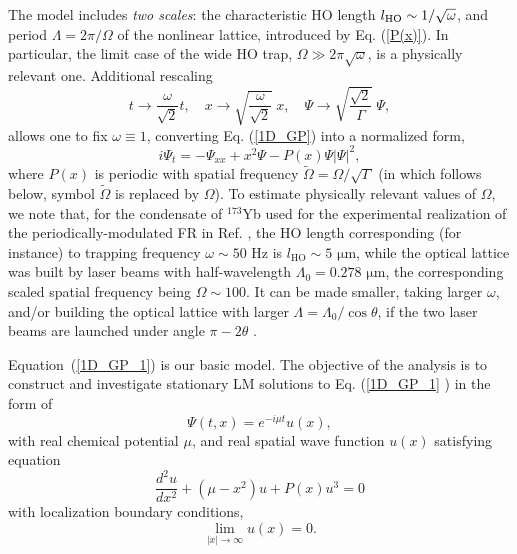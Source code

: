 \documentclass[aps,preprint,showkeys,
]{revtex4}
\begin{document}
The model includes \textit{two scales}: the characteristic HO length $l_{%
\mathrm{HO}}\sim 1/\sqrt{\omega }$, and period $\Lambda =2\pi /\Omega $ of
the nonlinear lattice, introduced by Eq. (\ref{P(x)}). In particular, the
limit case of the wide HO trap, $\Omega \gg 2\pi \sqrt{\omega }$, is a
physically relevant one. Additional rescaling
\begin{equation}
t\rightarrow \frac{\omega }{\sqrt{2}}t,\quad x\rightarrow \sqrt{\frac{\omega
}{\sqrt{2}}}~x,\quad \Psi \rightarrow \sqrt{\frac{\sqrt{2}}{\Gamma }}~\Psi ,
\label{Rescal01}
\end{equation}%
allows one to fix $\omega \equiv 1$, converting Eq. (\ref{1D_GP}) into a
normalized form,
\begin{equation}
i\Psi _{t}=-\Psi _{xx}+x^{2}\Psi -P(x)\Psi |\Psi |^{2},  \label{1D_GP_1}
\end{equation}%
where $P(x)$ is periodic with spatial frequency $\tilde{\Omega}=\Omega /%
\sqrt{\Gamma }$ (in which follows below, symbol $\tilde{\Omega}$ is replaced
by $\Omega $). To estimate physically relevant values of $\Omega $, we note
that, for the condensate of $^{173}$Yb used for the experimental realization
of the periodically-modulated FR in Ref. \cite{Japan}, the HO length
corresponding (for instance) to trapping frequency $\omega \sim 50$ Hz is $%
l_{\mathrm{HO}}\sim 5$ $\mathrm{\mu }$m, while the optical lattice was built
by laser beams with half-wavelength $\Lambda _{0}=0.278$ $\mathrm{\mu }$m,
the corresponding scaled spatial frequency being $\Omega \sim 100$. It can
be made smaller, taking larger $\omega $, and/or building the optical
lattice with larger $\Lambda =\Lambda _{0}/\cos \theta $, if the two laser
beams are launched under angle $\pi -2\theta $ \cite{OL}.

Equation~(\ref{1D_GP_1}) is our basic model. The objective of the analysis
is to construct and investigate stationary LM solutions to Eq. (\ref{1D_GP_1}%
) in the form of
\begin{equation}
\Psi (t,x)=e^{-i\mu t}u(x),
\end{equation}%
with real chemical potential $\mu $, and real \cite{AKS02} spatial wave
function $u(x)$ satisfying equation%
\begin{equation}
\frac{d^{2}u}{dx^{2}}+(\mu -x^{2})u+P(x)u^{3}=0  \label{eq1}
\end{equation}%
with localization boundary conditions,
\begin{equation}
\lim_{|x|\rightarrow \infty }u(x)=0.  \label{eq2}
\end{equation}
\end{document}
